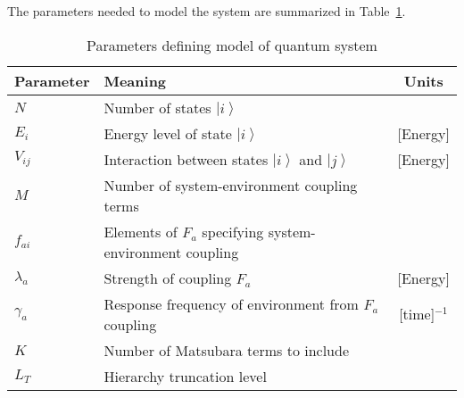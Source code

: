 \documentclass[11pt]{article}
\newcommand{\ket}[1]{{\left| #1 \right>}}
\begin{document}
The parameters needed to model the system are summarized in Table~\ref{tbl:parameters}.
\begin{table}[h!!tdp]
\caption{Parameters defining model of quantum system}
\begin{center}
\begin{tabular}{llc}
Parameter & Meaning & Units \\ 
\hline
$N$               & Number of states $\ket{i}$ & \\
$E_i$            & Energy level of state $\ket{i}$ & [Energy] \\
$V_{ij}$         & Interaction between states $\ket{i}$ and $\ket{j}$ & [Energy] \\
$M$              & Number of system-environment coupling terms & \\ 
$f_{ai}$         & Elements of $F_a$ specifying system-environment coupling & \\
$\lambda_a$ & Strength of coupling $F_a$ & [Energy]\\
$\gamma_a$ & Response frequency of environment from $F_a$ coupling & [time]$^{-1}$ \\
$K$                & Number of Matsubara terms to include\\
$L_T$            & Hierarchy truncation level\\
\hline
\end{tabular}
\end{center}
\label{tbl:parameters}
\end{table}%
\end{document}
